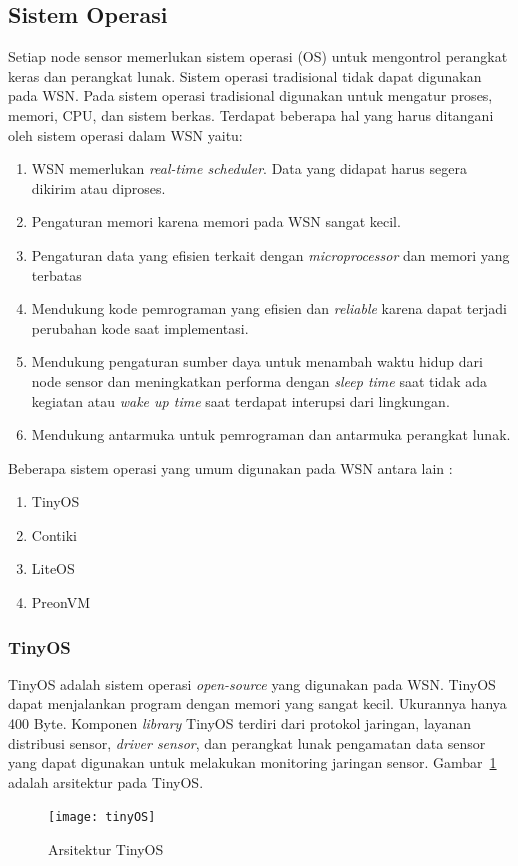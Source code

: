 \subsection{Sistem Operasi}
Setiap node sensor memerlukan sistem operasi (OS) untuk mengontrol perangkat keras dan perangkat lunak. Sistem operasi tradisional tidak dapat digunakan pada WSN. Pada sistem operasi tradisional digunakan untuk mengatur proses, memori, CPU, dan sistem berkas. Terdapat beberapa hal yang harus ditangani oleh sistem operasi dalam WSN yaitu:
\begin{enumerate}
	\item WSN memerlukan \textit{real-time scheduler}. Data yang didapat harus segera dikirim atau diproses.
	\item Pengaturan memori karena memori pada WSN sangat kecil.
	\item Pengaturan data yang efisien terkait dengan \textit{microprocessor} dan memori yang terbatas
	\item Mendukung kode pemrograman yang efisien dan \textit{reliable} karena dapat terjadi perubahan kode saat implementasi.
	\item Mendukung pengaturan sumber daya untuk menambah waktu hidup dari node sensor dan meningkatkan performa dengan \textit{sleep time} saat tidak ada kegiatan atau \textit{wake up time} saat terdapat interupsi dari lingkungan.
	\item Mendukung antarmuka untuk pemrograman dan antarmuka perangkat lunak. 
\end{enumerate}

Beberapa sistem operasi yang umum digunakan pada WSN antara lain :
\begin{enumerate}
	\item TinyOS
	\item Contiki
	\item LiteOS
	\item PreonVM
\end{enumerate}

\subsubsection{TinyOS}
TinyOS adalah sistem operasi \textit{open-source} yang digunakan pada WSN. TinyOS dapat menjalankan program dengan memori yang sangat kecil. Ukurannya hanya 400 Byte. Komponen \textit{library} TinyOS terdiri dari protokol jaringan, layanan distribusi sensor, \textit{driver sensor}, dan perangkat lunak pengamatan data sensor yang dapat digunakan untuk melakukan monitoring jaringan sensor. Gambar~\ref{fig:tinyOS} adalah arsitektur pada TinyOS. 
\begin{figure} [H]
	\centering  
	\texttt{[image: tinyOS]}  
	\caption[Arsitektur TinyOS]{Arsitektur TinyOS} 
	\label{fig:tinyOS} 
\end{figure}

